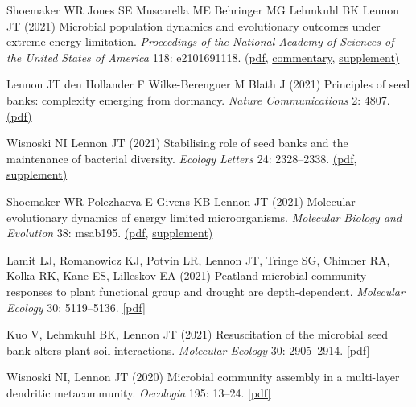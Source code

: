 \documentclass[11pt]{article}
\begin{document}
\begin{etaremune}
\item Shoemaker WR Jones SE Muscarella ME Behringer MG Lehmkuhl BK Lennon JT (2021) Microbial population dynamics and evolutionary outcomes under extreme energy-limitation. \textit{Proceedings of the National Academy of Sciences of the United States of America} 118: e2101691118. \href{https://lennonlab.github.io/assets/publications/Shoemaker_etal_2021b.pdf}{(pdf}, \href{https://lennonlab.github.io/assets/publications/Rillig_etal_2021.pdf}{commentary}, \href{https://lennonlab.github.io/assets/publications/Shoemaker_etal_2021b_Suppl.pdf}{supplement)}

\item Lennon JT den Hollander F Wilke-Berenguer M Blath J (2021) Principles of seed banks: complexity emerging from dormancy. \textit{Nature Communications} 2: 4807. \href{https://lennonlab.github.io/assets/publications/Lennon_etal_2021a.pdf}{(pdf)}

\item Wisnoski NI Lennon JT (2021) Stabilising role of seed banks and the maintenance of bacterial diversity. \textit{Ecology Letters} 24: 2328–2338. \href{https://lennonlab.github.io/assets/publications/Wisnoski_Lennon_2021.pdf}{(pdf}, \href{https://lennonlab.github.io/assets/publications/Wisnoski_Lennon_2021_Suppl.pdf}{supplement)}

\item Shoemaker WR Polezhaeva E Givens KB Lennon JT (2021) Molecular evolutionary dynamics of energy limited microorganisms. \textit{Molecular Biology and Evolution} 38: msab195. \href{https://lennonlab.github.io/assets/publications/Shoemaker_etal_2021a.pdf}{(pdf}, \href{https://lennonlab.github.io/assets/publications/Shoemaker_etal_2021a_Suppl.zip}{supplement)}

\item Lamit LJ, Romanowicz KJ, Potvin LR, Lennon JT, Tringe SG, Chimner RA, Kolka RK, Kane ES, Lilleskov EA (2021) Peatland microbial community responses to plant functional group and drought are depth-dependent. \textit{Molecular Ecology} 30: 5119–5136. \href{https://lennonlab.github.io/assets/publications/Lamit_etal_2021.pdf}{[pdf]}

\item Kuo V, Lehmkuhl BK, Lennon JT (2021) Resuscitation of the microbial seed bank alters plant-soil interactions. \textit{Molecular Ecology} 30: 2905–2914. \href{https://lennonlab.github.io/assets/publications/Kuo_etal_2021.pdf}{[pdf]}

\item Wisnoski NI, Lennon JT (2020) Microbial community assembly in a multi-layer dendritic metacommunity. \textit{Oecologia} 195: 13–24. \href{https://lennonlab.github.io/assets/publications/Wisnoski_Lennon_2020.pdf}{[pdf]}


\end{etaremune}
\end{document}
